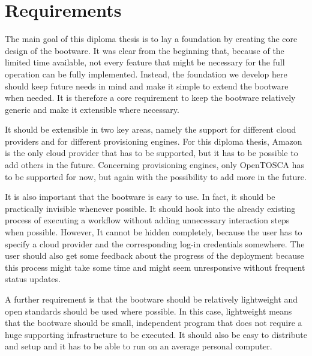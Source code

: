 \section{Requirements}

The main goal of this diploma thesis is to lay a foundation by creating the core design of the bootware.
It was clear from the beginning that, because of the limited time available, not every feature that might be necessary for the full operation can be fully implemented.
Instead, the foundation we develop here should keep future needs in mind and make it simple to extend the bootware when needed.
It is therefore a core requirement to keep the bootware relatively generic and make it extensible where necessary.

It should be extensible in two key areas, namely the support for different cloud providers and for different provisioning engines.
For this diploma thesis, Amazon is the only cloud provider that has to be supported, but it has to be possible to add others in the future.
Concerning provisioning engines, only OpenTOSCA has to be supported for now, but again with the possibility to add more in the future.

It is also important that the bootware is easy to use.
In fact, it should be practically invisible whenever possible.
It should hook into the already existing process of executing a workflow without adding unnecessary interaction steps when possible.
However, It cannot be hidden completely, because the user has to specify a cloud provider and the corresponding log-in credentials somewhere.
The user should also get some feedback about the progress of the deployment because this process might take some time and might seem unresponsive without frequent status updates.

A further requirement is that the bootware should be relatively lightweight and open standards should be used where possible.
In this case, lightweight means that the bootware should be small, independent program that does not require a huge supporting infrastructure to be executed.
It should also be easy to distribute and setup and it has to be able to run on an average personal computer.
